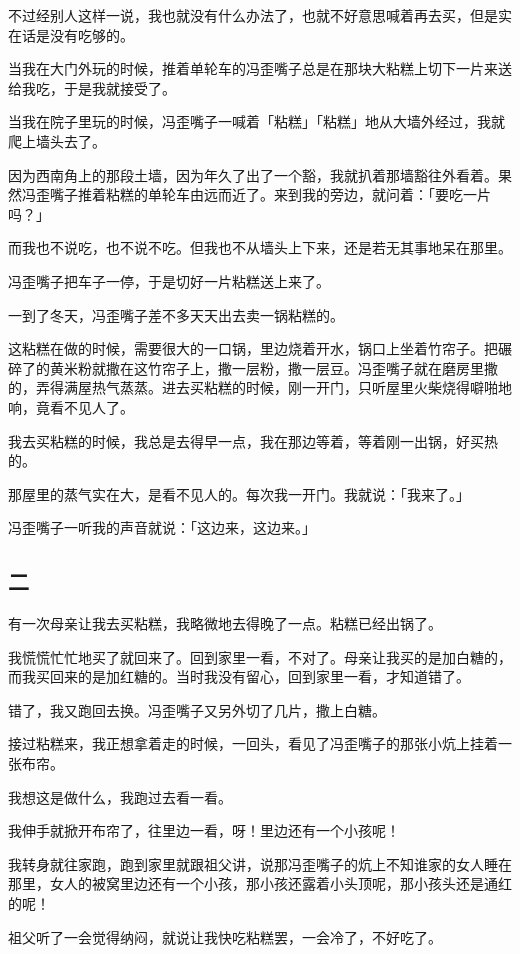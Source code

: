 \documentclass[UTF8]{ctexart}
\begin{document}
不过经别人这样一说，我也就没有什么办法了，也就不好意思喊着再去买，但是实在话是没有吃够的。

当我在大门外玩的时候，推着单轮车的冯歪嘴子总是在那块大粘糕上切下一片来送给我吃，于是我就接受了。

当我在院子里玩的时候，冯歪嘴子一喊着「粘糕」「粘糕」地从大墙外经过，我就爬上墙头去了。

因为西南角上的那段土墙，因为年久了出了一个豁，我就扒着那墙豁往外看着。果然冯歪嘴子推着粘糕的单轮车由远而近了。来到我的旁边，就问着：「要吃一片吗？」

而我也不说吃，也不说不吃。但我也不从墙头上下来，还是若无其事地呆在那里。

冯歪嘴子把车子一停，于是切好一片粘糕送上来了。

一到了冬天，冯歪嘴子差不多天天出去卖一锅粘糕的。

这粘糕在做的时候，需要很大的一口锅，里边烧着开水，锅口上坐着竹帘子。把碾碎了的黄米粉就撒在这竹帘子上，撒一层粉，撒一层豆。冯歪嘴子就在磨房里撒的，弄得满屋热气蒸蒸。进去买粘糕的时候，刚一开门，只听屋里火柴烧得噼啪地响，竟看不见人了。

我去买粘糕的时候，我总是去得早一点，我在那边等着，等着刚一出锅，好买热的。

那屋里的蒸气实在大，是看不见人的。每次我一开门。我就说：「我来了。」

冯歪嘴子一听我的声音就说：「这边来，这边来。」

\subsection{二}

有一次母亲让我去买粘糕，我略微地去得晚了一点。粘糕已经出锅了。

我慌慌忙忙地买了就回来了。回到家里一看，不对了。母亲让我买的是加白糖的，而我买回来的是加红糖的。当时我没有留心，回到家里一看，才知道错了。

错了，我又跑回去换。冯歪嘴子又另外切了几片，撒上白糖。

接过粘糕来，我正想拿着走的时候，一回头，看见了冯歪嘴子的那张小炕上挂着一张布帘。

我想这是做什么，我跑过去看一看。

我伸手就掀开布帘了，往里边一看，呀！里边还有一个小孩呢！

我转身就往家跑，跑到家里就跟祖父讲，说那冯歪嘴子的炕上不知谁家的女人睡在那里，女人的被窝里边还有一个小孩，那小孩还露着小头顶呢，那小孩头还是通红的呢！

祖父听了一会觉得纳闷，就说让我快吃粘糕罢，一会冷了，不好吃了。
\end{document}
